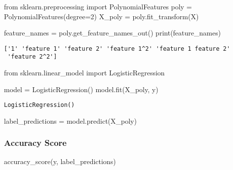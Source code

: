 \documentclass[
  letterpaper,
  DIV=11,
  numbers=noendperiod]{scrreprt}
\newenvironment{Shaded}{\begin{snugshade}}{\end{snugshade}}
\newcommand{\BuiltInTok}[1]{\textcolor[rgb]{0.00,0.23,0.31}{#1}}
\newcommand{\DecValTok}[1]{\textcolor[rgb]{0.68,0.00,0.00}{#1}}
\newcommand{\ImportTok}[1]{\textcolor[rgb]{0.00,0.46,0.62}{#1}}
\newcommand{\NormalTok}[1]{\textcolor[rgb]{0.00,0.23,0.31}{#1}}
\newcommand{\OperatorTok}[1]{\textcolor[rgb]{0.37,0.37,0.37}{#1}}
\begin{document}
\begin{Shaded}
\begin{Highlighting}[]
\ImportTok{from}\NormalTok{ sklearn.preprocessing }\ImportTok{import}\NormalTok{ PolynomialFeatures}
\NormalTok{poly }\OperatorTok{=}\NormalTok{ PolynomialFeatures(degree}\OperatorTok{=}\DecValTok{2}\NormalTok{)}
\NormalTok{X\_poly }\OperatorTok{=}\NormalTok{ poly.fit\_transform(X)}
\end{Highlighting}
\end{Shaded}

\begin{Shaded}
\begin{Highlighting}[]
\NormalTok{feature\_names }\OperatorTok{=}\NormalTok{ poly.get\_feature\_names\_out()}
\BuiltInTok{print}\NormalTok{(feature\_names)}
\end{Highlighting}
\end{Shaded}

\begin{verbatim}
['1' 'feature 1' 'feature 2' 'feature 1^2' 'feature 1 feature 2'
 'feature 2^2']
\end{verbatim}

\begin{Shaded}
\begin{Highlighting}[]
\ImportTok{from}\NormalTok{ sklearn.linear\_model }\ImportTok{import}\NormalTok{ LogisticRegression}

\NormalTok{model }\OperatorTok{=}\NormalTok{ LogisticRegression()}
\NormalTok{model.fit(X\_poly, y)}
\end{Highlighting}
\end{Shaded}

\begin{verbatim}
LogisticRegression()
\end{verbatim}

\begin{Shaded}
\begin{Highlighting}[]
\NormalTok{label\_predictions }\OperatorTok{=}\NormalTok{ model.predict(X\_poly)}
\end{Highlighting}
\end{Shaded}

\subsubsection{Accuracy Score}\label{accuracy-score}

\begin{Shaded}
\begin{Highlighting}[]
\NormalTok{accuracy\_score(y, label\_predictions)}
\end{Highlighting}
\end{Shaded}
\end{document}
